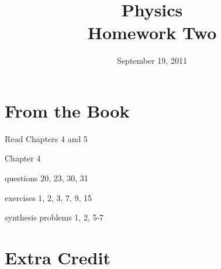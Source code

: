 \documentclass{exam}
\title{Physics \\ Homework Two}
\date{September 19, 2011}
\begin{document}
\maketitle

\section{From the Book}

\begin{itemize*}
  \item Read Chapters 4 and 5
  \item Chapter 4
    \begin{itemize*}
      \item questions 20, 23, 30, 31
      \item exercises 1, 2, 3, 7, 9, 15
      \item synthesis problems 1, 2, 5-7
    \end{itemize*}


\end{itemize*}

\section{Extra Credit}
\end{document}
